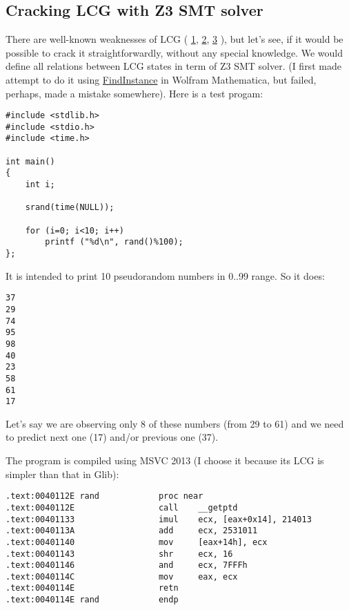 \subsection{Cracking LCG with Z3 \ac{SMT} solver}


There are well-known weaknesses of LCG (
\href{http://en.wikipedia.org/wiki/Linear_congruential_generator#Advantages_and_disadvantages_of_LCGs}{1},
\href{http://www.reteam.org/papers/e59.pdf}{2}, %
\href{http://stackoverflow.com/questions/8569113/why-1103515245-is-used-in-rand/8574774#8574774}{3}
), but let's see, if it would be possible to crack it straightforwardly, without any special knowledge.
We would define all relations between LCG states in term of Z3 \ac{SMT} solver.
(I first made attempt to do it using \href{https://reference.wolfram.com/language/ref/FindInstance.html}{FindInstance} in Wolfram Mathematica, but failed, perhaps, made a mistake somewhere).
Here is a test progam:

\begin{lstlisting}
#include <stdlib.h>
#include <stdio.h>
#include <time.h>

int main()
{
	int i;

	srand(time(NULL));

	for (i=0; i<10; i++)
		printf ("%d\n", rand()%100);
};
\end{lstlisting}

It is intended to print 10 pseudorandom numbers in 0..99 range.
So it does:

\begin{lstlisting}
37
29
74
95
98
40
23
58
61
17
\end{lstlisting}

Let's say we are observing only 8 of these numbers (from 29 to 61) and we need to predict next one (17) and/or previous one (37).

The program is compiled using MSVC 2013 (I choose it because its LCG is simpler than that in Glib):

\begin{lstlisting}
.text:0040112E rand            proc near
.text:0040112E                 call    __getptd
.text:00401133                 imul    ecx, [eax+0x14], 214013
.text:0040113A                 add     ecx, 2531011
.text:00401140                 mov     [eax+14h], ecx
.text:00401143                 shr     ecx, 16
.text:00401146                 and     ecx, 7FFFh
.text:0040114C                 mov     eax, ecx
.text:0040114E                 retn
.text:0040114E rand            endp
\end{lstlisting}

